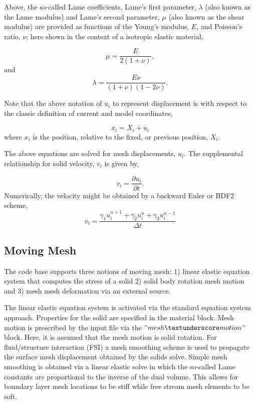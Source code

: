 Above, the so-called Lame coefficients, Lame's first parameter, $\lambda$ (also known 
as the Lame modulus) and Lame's second parameter, $\mu$ (also known as the shear modulus) 
are provided as functions of the Young's modulus, $E$, and Poisson's ratio, $\nu$; 
here shown in the context of a isotropic elastic material,

\begin{equation}
 \mu = \frac{E}{2\left(1+\nu\right)},
\label{lame_mu}
\end{equation}
and
\begin{equation}
 \lambda = \frac{E \nu}{\left(1+\nu\right) \left(1-2 \nu \right)}.
\label{lame_lambda}
\end{equation}

Note that the above notation of $u_i$ to represent displacement is with respect to
the classic definition of current and model coordinates,

\begin{equation}
 x_i = X_i + u_i
\label{displacement}
\end{equation}
where $x_i$ is the position, relative to the fixed, or previous position, $X_i$.

The above equations are solved for mesh displacements, $u_i$. The supplemental
relationship for solid velocity, $v_i$ is given by,

\begin{equation}
 v_i = \frac{\partial u_i}{\partial t}.
\label{velocity}
\end{equation}
Numerically, the velocity might be obtained by a backward Euler or BDF2 scheme,
\begin{equation}
 v_i = \frac{\gamma_1 u^{n+1}_i + \gamma_2 u^n_i + \gamma_3 u^{n-1}_i}{\Delta t}
\label{mesh_velocity+numerical}
\end{equation}

\subsection{Moving Mesh}
The code base supports three notions of moving mesh: 1) linear elastic equation system
that computes the stress of a solid 2) solid body rotation mesh motion and 3) mesh 
mesh deformation via an external source.

The linear elastic equation system is activated via the standard equation system approach.
Properties for the solid are specified in the material block. Mesh motion is prescribed by 
the input file via the ''$mesh \textunderscore motion$'' block. Here, it is assumed that the mesh motion 
is solid rotation. For fluid/structure interaction
(FSI) a mesh smoothing scheme is used to propagate the surface mesh displacement
obtained by the solids solve. Simple mesh smoothing is obtained via a linear elastic 
solve in which the so-called Lame constants are proportional to the inverse of the
dual volume. This allows for boundary layer mesh locations to be stiff while free 
stream mesh elements to be soft. 

